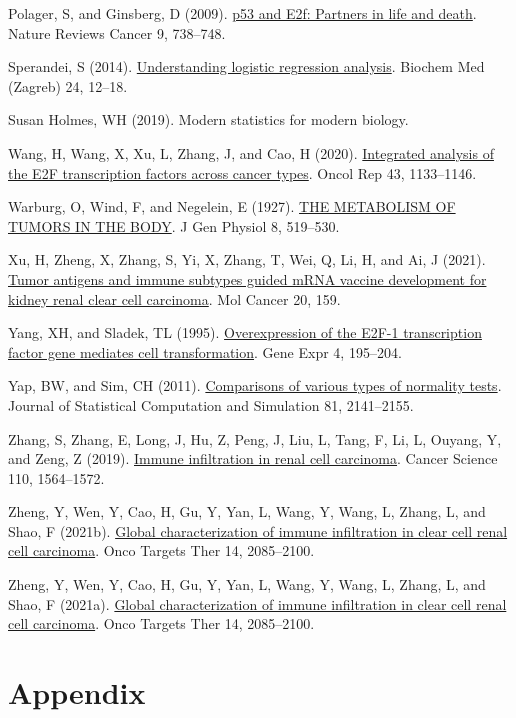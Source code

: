 \documentclass[
  parskip,
  oneside]{scrreprt}
\newlength{\cslhangindent}
\newlength{\cslentryspacingunit} %
\newenvironment{CSLReferences}[2] %
 {%
  \setlength{\parindent}{0pt}
  \ifodd #1
  \let\oldpar\par
  \def\par{\hangindent=\cslhangindent\oldpar}
  \fi
  \setlength{\parskip}{#2\cslentryspacingunit}
 }%
 {}
\begin{document}
\begin{CSLReferences}{0}{0}
\leavevmode{}%
Polager, S, and Ginsberg, D (2009).
\href{https://doi.org/10.1038/nrc2718}{p53 and E2f: Partners in life and
death}. Nature Reviews Cancer 9, 738--748.

\leavevmode{}%
Sperandei, S (2014).
\href{https://doi.org/10.11613/BM.2014.003}{Understanding logistic
regression analysis}. Biochem Med (Zagreb) 24, 12--18.

\leavevmode{}%
Susan Holmes, WH (2019). Modern statistics for modern biology.

\leavevmode{}%
Wang, H, Wang, X, Xu, L, Zhang, J, and Cao, H (2020).
\href{https://doi.org/10.3892/or.2020.7504}{Integrated analysis of the
E2F transcription factors across cancer types}. Oncol Rep 43,
1133--1146.

\leavevmode{}%
Warburg, O, Wind, F, and Negelein, E (1927).
\href{https://doi.org/10.1085/jgp.8.6.519}{THE METABOLISM OF TUMORS IN
THE BODY}. J Gen Physiol 8, 519--530.

\leavevmode{}%
Xu, H, Zheng, X, Zhang, S, Yi, X, Zhang, T, Wei, Q, Li, H, and Ai, J
(2021). \href{https://doi.org/10.1186/s12943-021-01465-w}{Tumor antigens
and immune subtypes guided mRNA vaccine development for kidney renal
clear cell carcinoma}. Mol Cancer 20, 159.

\leavevmode{}%
Yang, XH, and Sladek, TL (1995).
\href{https://www.ncbi.nlm.nih.gov/pubmed/7787412}{Overexpression of the
E2F-1 transcription factor gene mediates cell transformation}. Gene Expr
4, 195--204.

\leavevmode{}%
Yap, BW, and Sim, CH (2011).
\href{https://doi.org/10.1080/00949655.2010.520163}{Comparisons of
various types of normality tests}. Journal of Statistical Computation
and Simulation 81, 2141--2155.

\leavevmode{}%
Zhang, S, Zhang, E, Long, J, Hu, Z, Peng, J, Liu, L, Tang, F, Li, L,
Ouyang, Y, and Zeng, Z (2019).
\href{https://doi.org/10.1111/cas.13996}{Immune infiltration in renal
cell carcinoma}. Cancer Science 110, 1564--1572.

\leavevmode{}%
Zheng, Y, Wen, Y, Cao, H, Gu, Y, Yan, L, Wang, Y, Wang, L, Zhang, L, and
Shao, F (2021b). \href{https://doi.org/10.2147/ott.S282763}{Global
characterization of immune infiltration in clear cell renal cell
carcinoma}. Onco Targets Ther 14, 2085--2100.

\leavevmode{}%
Zheng, Y, Wen, Y, Cao, H, Gu, Y, Yan, L, Wang, Y, Wang, L, Zhang, L, and
Shao, F (2021a). \href{https://doi.org/10.2147/ott.S282763}{Global
characterization of immune infiltration in clear cell renal cell
carcinoma}. Onco Targets Ther 14, 2085--2100.

\end{CSLReferences}

\hypertarget{appendix}{%
\chapter{Appendix}\label{appendix}}
\end{document}
